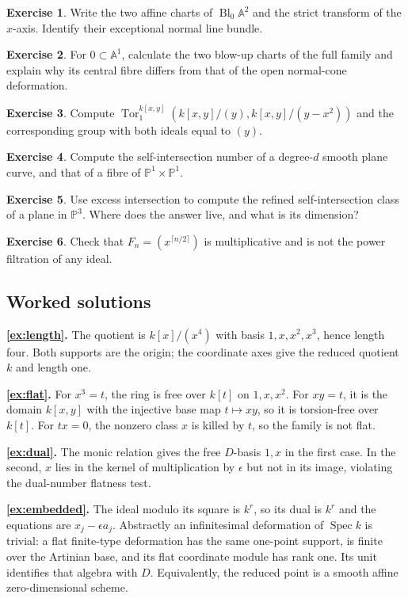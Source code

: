\documentclass[11pt,a4paper]{article}
\numberwithin{equation}{section}
\theoremstyle{definition}
\newtheorem{exercise}{Exercise}
\newcommand{\A}{\mathbb A}
\newcommand{\PP}{\mathbb P}
\newcommand{\Spec}{\operatorname{Spec}}
\newcommand{\Tor}{\operatorname{Tor}}
\newcommand{\Bl}{\operatorname{Bl}}
\begin{document}
\begin{exercise}\label{ex:blowup}
Write the two affine charts of $\Bl_0\A^2$ and the strict transform
of the $x$-axis. Identify their exceptional normal line bundle.
\end{exercise}
\begin{exercise}\label{ex:full}
For $0\subset\A^1$, calculate the two blow-up charts of the full
family and explain why its central fibre differs from that of the
open normal-cone deformation.
\end{exercise}
\begin{exercise}\label{ex:tor}
Compute $\Tor_1^{k[x,y]}(k[x,y]/(y),k[x,y]/(y-x^2))$ and the
corresponding group with both ideals equal to $(y)$.
\end{exercise}
\begin{exercise}\label{ex:self}
Compute the self-intersection number of a degree-$d$ smooth plane
curve, and that of a fibre of $\PP^1\times\PP^1$.
\end{exercise}
\begin{exercise}\label{ex:excess}
Use excess intersection to compute the refined self-intersection
class of a plane in $\PP^3$. Where does the answer live, and what
is its dimension?
\end{exercise}
\begin{exercise}\label{ex:filter}
Check that $F_n=(x^{\lceil n/2\rceil})$ is multiplicative and is
not the power filtration of any ideal.
\end{exercise}

\subsection*{Worked solutions}
\textbf{\ref{ex:length}.} The quotient is $k[x]/(x^4)$ with basis
$1,x,x^2,x^3$, hence length four. Both supports are the origin;
the coordinate axes give the reduced quotient $k$ and length one.

\textbf{\ref{ex:flat}.} For $x^3=t$, the ring is free over $k[t]$
on $1,x,x^2$. For $xy=t$, it is the domain $k[x,y]$ with the
injective base map $t\mapsto xy$, so it is torsion-free over $k[t]$.
For $tx=0$, the nonzero class $x$ is killed by $t$, so the family
is not flat.

\textbf{\ref{ex:dual}.} The monic relation gives the free $D$-basis
$1,x$ in the first case. In the second, $x$ lies in the kernel of
multiplication by $\epsilon$ but not in its image, violating the
dual-number flatness test.

\textbf{\ref{ex:embedded}.} The ideal modulo its square is $k^r$,
so its dual is $k^r$ and the equations are
$x_j-\epsilon a_j$. Abstractly an infinitesimal deformation of
$\Spec k$ is trivial: a flat finite-type deformation has the same
one-point support, is finite over the Artinian base, and its flat
coordinate module has rank one. Its unit identifies that algebra
with $D$. Equivalently, the reduced point is a smooth affine
zero-dimensional scheme.
\end{document}
